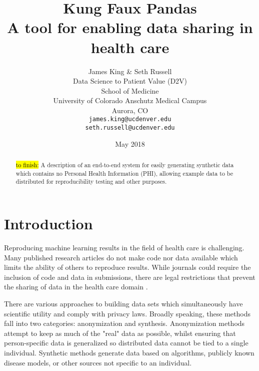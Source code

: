 \documentclass{article}
\title{%
  Kung Faux Pandas \\
  \large A tool for enabling data sharing in health care}
\author{
  James King \& Seth Russell\\
  Data Science to Patient Value (D2V)\\
  School of Medicine \\
  University of Colorado Anschutz Medical Campus\\
  Aurora, CO\\
  \texttt{james.king@ucdenver.edu} \\
  \texttt{seth.russell@ucdenver.edu} \\
  }
\date{May 2018}
\begin{document}

\makeatletter

\newenvironment{chapquote}[2][2em]
  {\setlength{\@tempdima}{#1}%
   \def\chapquote@author{#2}%
   \parshape 1 \@tempdima \dimexpr\textwidth-2\@tempdima\relax%
   \itshape}
  {\par\normalfont\hfill--\ \chapquote@author\hspace*{\@tempdima}\par\bigskip}
\makeatother

\maketitle

\begin{abstract}
\hl{to finish:} A description of an end-to-end system for easily generating synthetic data which contains no Personal Health Information (PHI), allowing example data to be distributed for reproducibility testing and other purposes.  

\end{abstract}


\section{Introduction}

Reproducing machine learning results in the field of health care is challenging. Many published research articles do not make code nor data available which limits the ability of others to reproduce results. While journals could require the inclusion of code and data in submissions, there are legal restrictions that prevent the sharing of data in the health care domain \cite{hippapro}.

There are various approaches to building data sets which simultaneously have scientific utility and comply with privacy laws. Broadly speaking, these methods fall into two categories: anonymization and synthesis. Anonymization methods attempt to keep as much of the "real" data as possible, whilst ensuring that person-specific data is generalized so distributed data cannot be tied to a single individual. Synthetic methods generate data based on algorithms, publicly known disease models, or other sources not specific to an individual.
\end{document}
